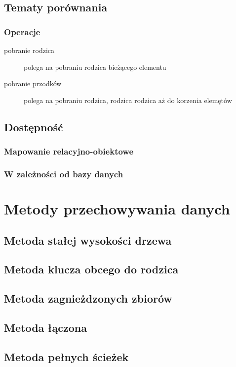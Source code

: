 \documentclass[10pt,a4paper,draft]{book}
\begin{document}
\section{Tematy porównania}
\subsection{Operacje}
\begin{description}
 \item[pobranie rodzica] polega na pobraniu rodzica bieżącego elementu
 \item[pobranie przodków] polega na pobraniu rodzica, rodzica rodzica aż do korzenia elemętów
 \end{description}

\section{Dostępność}
\subsection{Mapowanie relacyjno-obiektowe}
\subsection{W zależności od bazy danych}

\chapter{Metody przechowywania danych}

\section{Metoda stałej wysokości drzewa}

\section{Metoda klucza obcego do rodzica}

\section{Metoda zagnieżdzonych zbiorów}

\section{Metoda łączona}

\section{Metoda pełnych ścieżek}
\end{document}
